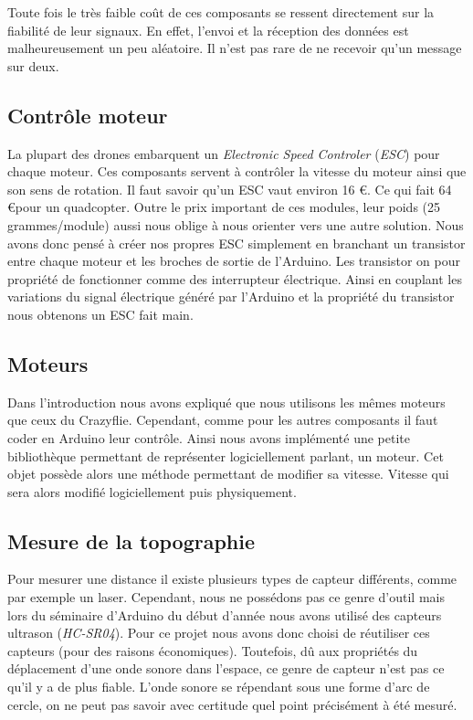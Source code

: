 \documentclass[a4paper,10pt]{report}
\begin{document}
	Toute fois le très faible coût de ces composants se ressent directement 
sur la fiabilité de leur signaux. En effet, l'envoi et la réception des données 
est malheureusement un peu aléatoire. Il n'est pas rare de ne recevoir qu'un 
message sur deux.
	
      
      \subsection{Contrôle moteur}
	La plupart des drones embarquent un \textit{Electronic Speed Controler} 
(\textit{ESC}) pour chaque moteur. Ces composants servent à contrôler la 
vitesse du moteur ainsi que son sens de rotation. Il faut savoir qu'un ESC vaut 
environ 16 \euro. Ce qui fait 64 \euro \space pour un quadcopter. Outre le prix 
important de ces modules, leur poids (25 grammes/module) aussi nous oblige à 
nous orienter vers une autre solution. Nous avons donc pensé à créer nos propres 
ESC simplement en branchant un transistor entre chaque moteur et les broches de 
sortie de l’Arduino. Les transistor on pour propriété de fonctionner comme des 
interrupteur électrique. Ainsi en couplant les variations du signal électrique 
généré par l'Arduino et la propriété du transistor nous obtenons un ESC fait 
main.

      \subsection{Moteurs}
	Dans l'introduction nous avons expliqué que nous utilisons les mêmes 
moteurs que ceux du Crazyflie. Cependant, comme pour les autres composants il 
faut coder en Arduino leur contrôle. Ainsi nous avons implémenté une petite 
bibliothèque permettant de représenter logiciellement parlant, un moteur. Cet 
objet possède alors une méthode permettant de modifier sa vitesse. Vitesse qui 
sera alors modifié logiciellement puis physiquement.

      \subsection{Mesure de la topographie}
	Pour mesurer une distance il existe plusieurs types de capteur 
différents, comme par exemple un laser. Cependant, nous ne possédons pas ce 
genre d'outil mais lors du séminaire d'Arduino du début d'année nous avons 
utilisé des capteurs ultrason (\textit{HC-SR04}). Pour ce projet nous avons 
donc choisi de réutiliser ces capteurs (pour des raisons économiques). 
Toutefois, dû aux propriétés du déplacement d'une onde sonore dans l'espace, ce 
genre de capteur n'est pas ce qu'il y a de plus fiable. L'onde sonore se 
répendant sous une forme d'arc de cercle, on ne peut pas savoir avec certitude 
quel point précisément à été mesuré.
\end{document}

